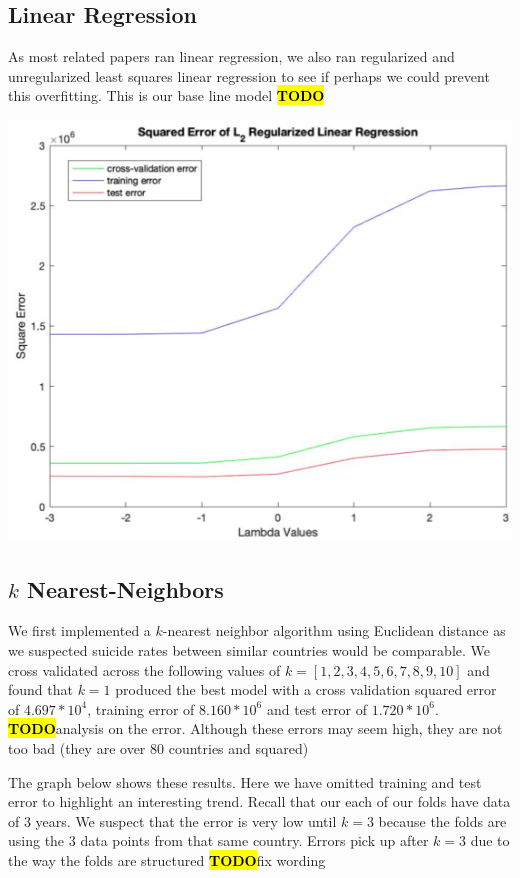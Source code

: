 \documentclass{article}
\newcommand{\TODO}{\textcolor{red}{\textbf{\hl{TODO}}}}
\begin{document}
\begin{multicols}{2}
\subsection{Linear Regression} As most related papers ran linear regression, we also ran regularized and unregularized least squares linear regression to see if perhaps we could prevent this overfitting. This is our base line model \TODO 

\includegraphics[width=\columnwidth]{lin-reg.png}

\subsection{$k$ Nearest-Neighbors} We first implemented a $k$-nearest neighbor algorithm using Euclidean distance as we suspected suicide rates between similar countries would be comparable. We cross validated across the following values of $k = [1,2, 3, 4, 5, 6, 7, 8, 9, 10]$ and found that $k = 1$ produced the best model with a cross validation squared error of $4.697 * 10^4$, training error of $8.160 * 10^6$ and test error of $1.720 * 10^6$. \TODO analysis on the error. Although these errors may seem high, they are not too bad (they are over 80 countries and squared)

The graph below shows these results. Here we have omitted training and test error to highlight an interesting trend. Recall that our each of our folds have data of $3$ years. We suspect that the error is very low until $k = 3$ because the folds are using the $3$ data points from that same country. Errors pick up after $k = 3$ due to the way the folds are structured \TODO fix wording


\end{multicols}
\end{document}
